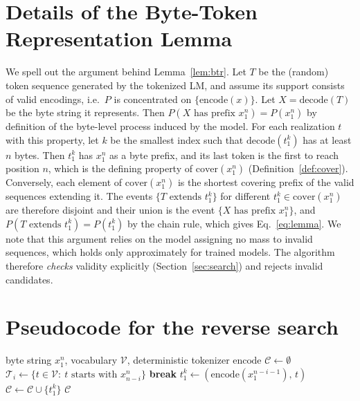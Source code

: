 \documentclass{article} %
\newcommand{\vocab}{\mathcal{V}}
\newcommand{\enc}{\mathrm{encode}}
\newcommand{\dec}{\mathrm{decode}}
\newcommand{\cover}{\mathrm{cover}}
\begin{document}
\section{Details of the Byte-Token Representation Lemma}
\label{app:lemma}
We spell out the argument behind Lemma~\ref{lem:btr}. Let $T$ be the (random) token sequence generated by the tokenized LM, and assume its support consists of valid encodings, i.e.\ $P$ is concentrated on $\{\enc(x)\}$. Let $X=\dec(T)$ be the byte string it represents. Then $P(X \text{ has prefix } x_1^n)=P(x_1^n)$ by definition of the byte-level process induced by the model. For each realization $t$ with this property, let $k$ be the smallest index such that $\dec(t_1^k)$ has at least $n$ bytes. Then $t_1^k$ has $x_1^n$ as a byte prefix, and its last token is the first to reach position $n$, which is the defining property of $\cover(x_1^n)$ (Definition~\ref{def:cover}). Conversely, each element of $\cover(x_1^n)$ is the shortest covering prefix of the valid sequences extending it. The events $\{T \text{ extends } t_1^k\}$ for different $t_1^k\in\cover(x_1^n)$ are therefore disjoint and their union is the event $\{X\text{ has prefix }x_1^n\}$, and $P(T\text{ extends }t_1^k)=P(t_1^k)$ by the chain rule, which gives Eq.~\eqref{eq:lemma}. We note that this argument relies on the model assigning no mass to invalid sequences, which holds only approximately for trained models. The algorithm therefore \emph{checks} validity explicitly (Section~\ref{sec:search}) and rejects invalid candidates.

\section{Pseudocode for the reverse search}
\label{app:alg}
\begin{algorithm}[h]
\caption{Cover encodings by backward tokenization}
\label{alg:search}
\begin{algorithmic}[1]
\Require byte string $x_1^n$, vocabulary $\vocab$, deterministic tokenizer $\enc$
\State $\mathcal{C}\leftarrow\emptyset$
\State $\mathcal{T}_i\leftarrow\{t\in\vocab:\ t \text{ starts with } x_{n-i}^{n}\}$
 \textbf{break} 
\EndIf
{}
\State $t_1^k\leftarrow(\enc(x_1^{n-i-1}),\,t)$
\If{$\enc(\dec(t_1^k))=t_1^k$} \State $\mathcal{C}\leftarrow\mathcal{C}\cup\{t_1^k\}$
\EndIf
\EndFor
\EndFor
\State \Return $\mathcal{C}$
\end{algorithmic}
\end{algorithm}
\end{document}
